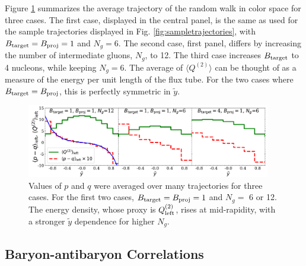 \documentclass[aps, prc, 12pt, nofootinbib, showpacs, superscriptaddress, tightenlines, groupedaddress]{revtex4-2}
\begin{document}
Figure \ref{fig:averagetrajectory} summarizes the average trajectory of the random walk in color space for three cases. The first case, displayed in the central panel, is the same as used for the sample trajectories displayed in Fig. \ref{fig:sampletrajectories}, with $B_{\rm target}=B_{\rm proj}=1$ and $N_g=6$. The second case, first panel, differs by increasing the number of intermediate gluons, $N_g$, to 12. The third case increases $B_{\rm target}$ to 4 nucleons, while keeping $N_g=6$. The average of $\langle Q^{(2)}\rangle$ can be thought of as a measure of the energy per unit length of the flux tube. For the two cases where $B_{\rm target}=B_{\rm proj}$, this is perfectly symmetric in $\tilde{y}$. 
\begin{figure}
\centerline{\includegraphics[width=0.95\textwidth]{figs/average_trajectory.pdf}}
\caption{\label{fig:averagetrajectory}
Values of $p$ and $q$ were averaged over many trajectories for three cases. For the first two cases, $B_{\rm target}=B_{\rm proj}=1$ and $N_g=$ 6 or 12. The energy density, whose proxy is $Q^{(2)}_{\rm left}$, rises at mid-rapidity, with a stronger $\tilde{y}$ dependence for higher $N_g$.
}
\end{figure}

\subsection{Baryon-antibaryon Correlations}
\end{document}

